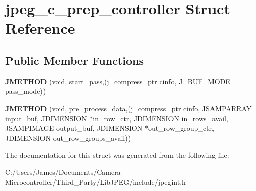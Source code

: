 \hypertarget{structjpeg__c__prep__controller}{}\section{jpeg\+\_\+c\+\_\+prep\+\_\+controller Struct Reference}
\label{structjpeg__c__prep__controller}
\subsection*{Public Member Functions}
\begin{DoxyCompactItemize}
\item 
\mbox{\label{structjpeg__c__prep__controller_ad56be8c40b98dd5bb131e6b98cbd75f4}} 
{\bfseries J\+M\+E\+T\+H\+OD} (void, start\+\_\+pass,(\hyperlink{structjpeg__compress__struct}{j\+\_\+compress\+\_\+ptr} cinfo, J\+\_\+\+B\+U\+F\+\_\+\+M\+O\+DE pass\+\_\+mode))
\item 
\mbox{\label{structjpeg__c__prep__controller_a10bd8c9abfa528434829b8fa34af95c8}} 
{\bfseries J\+M\+E\+T\+H\+OD} (void, pre\+\_\+process\+\_\+data,(\hyperlink{structjpeg__compress__struct}{j\+\_\+compress\+\_\+ptr} cinfo, J\+S\+A\+M\+P\+A\+R\+R\+AY input\+\_\+buf, J\+D\+I\+M\+E\+N\+S\+I\+ON $\ast$in\+\_\+row\+\_\+ctr, J\+D\+I\+M\+E\+N\+S\+I\+ON in\+\_\+rows\+\_\+avail, J\+S\+A\+M\+P\+I\+M\+A\+GE output\+\_\+buf, J\+D\+I\+M\+E\+N\+S\+I\+ON $\ast$out\+\_\+row\+\_\+group\+\_\+ctr, J\+D\+I\+M\+E\+N\+S\+I\+ON out\+\_\+row\+\_\+groups\+\_\+avail))
\end{DoxyCompactItemize}


The documentation for this struct was generated from the following file\+:\begin{DoxyCompactItemize}
\item 
C\+:/\+Users/\+James/\+Documents/\+Camera-\/\+Microcontroller/\+Third\+\_\+\+Party/\+Lib\+J\+P\+E\+G/include/jpegint.\+h\end{DoxyCompactItemize}
